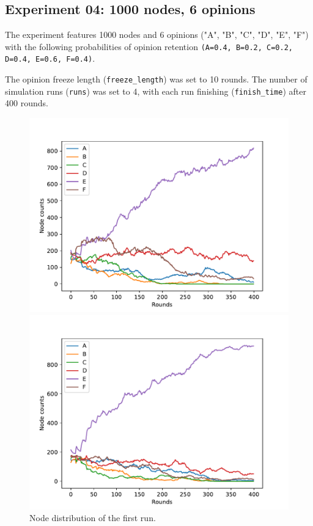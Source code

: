 \documentclass[11pt]{article}
\begin{document}
\pagebreak

\subsection*{Experiment 04: 1000 nodes, 6 opinions}

The experiment features 1000 nodes and 6 opinions ("A", "B", "C", "D", "E", "F") with the following probabilities of opinion retention \verb|(A=0.4, B=0.2, C=0.2, D=0.4, E=0.6, F=0.4)|.

\medskip

\noindent The opinion freeze length (\verb|freeze_length|) was set to 10 rounds. The number of simulation runs (\verb|runs|) was set to 4, with each run finishing (\verb|finish_time|) after 400 rounds.

\begin{figure}[ht] 
  \label{ fig7}
  \begin{minipage}[b]{0.5\linewidth}
    \centering
    \includegraphics[width=0.9\linewidth]{results/04/run-1/distribution} 
    \caption{Node distribution of the first run.} 
  \end{minipage}%
  \begin{minipage}[b]{0.5\linewidth}
    \centering
    \includegraphics[width=0.9\linewidth]{results/04/run-2/distribution} 

\end{minipage}
\end{figure}
\end{document}
